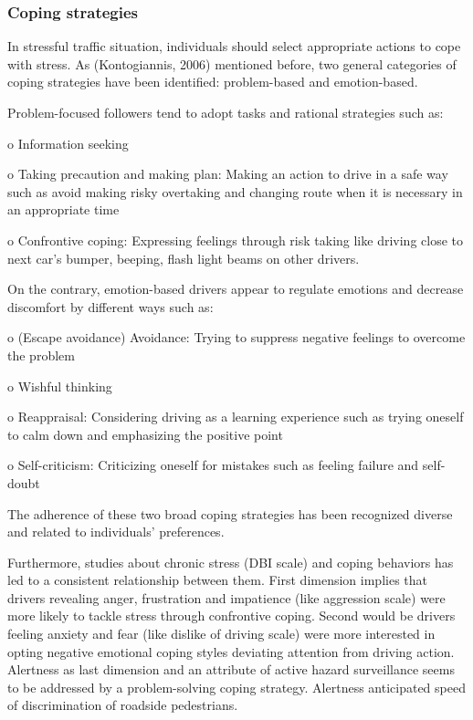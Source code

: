 \documentclass[
11pt, %
oneside, %
english, %
singlespacing, %
]{macthesis} %
\begin{document}
\hypertarget{coping-strategies}{%
\subsubsection{Coping strategies}\label{coping-strategies}}

In stressful traffic situation, individuals should select appropriate actions to cope with stress. As (Kontogiannis, 2006) mentioned before, two general categories of coping strategies have been identified: problem-based and emotion-based.

Problem-focused followers tend to adopt tasks and rational strategies such as:

o Information seeking

o Taking precaution and making plan: Making an action to drive in a safe way such as avoid making risky overtaking and changing route when it is necessary in an appropriate time

o Confrontive coping: Expressing feelings through risk taking like driving close to next car's bumper, beeping, flash light beams on other drivers.

On the contrary, emotion-based drivers appear to regulate emotions and decrease discomfort by different ways such as:

o (Escape avoidance) Avoidance: Trying to suppress negative feelings to overcome the problem

o Wishful thinking

o Reappraisal: Considering driving as a learning experience such as trying oneself to calm down and emphasizing the positive point

o Self-criticism: Criticizing oneself for mistakes such as feeling failure and self-doubt

The adherence of these two broad coping strategies has been recognized diverse and related to individuals' preferences.

Furthermore, studies about chronic stress (DBI scale) and coping behaviors has led to a consistent relationship between them. First dimension implies that drivers revealing anger, frustration and impatience (like aggression scale) were more likely to tackle stress through confrontive coping. Second would be drivers feeling anxiety and fear (like dislike of driving scale) were more interested in opting negative emotional coping styles deviating attention from driving action. Alertness as last dimension and an attribute of active hazard surveillance seems to be addressed by a problem-solving coping strategy. Alertness anticipated speed of discrimination of roadside pedestrians.
\end{document}

